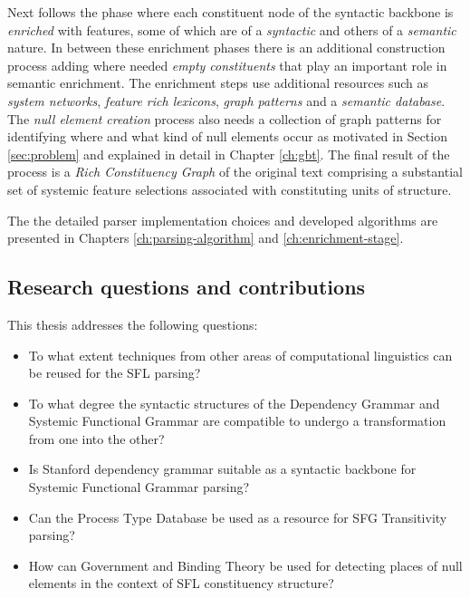 Next follows the phase where each constituent node of the syntactic backbone is \textit{enriched} with features, some of which are of a \textit{syntactic} and others of a \textit{semantic} nature. In between these enrichment phases there is an additional construction process adding where needed \textit{empty constituents} that play an important role in semantic enrichment. The enrichment steps use additional resources such as \textit{system networks}, \textit{feature rich lexicons}, \textit{graph patterns} and a \textit{semantic database}. The \textit{null element creation} process also needs a collection of graph patterns for identifying where and what kind of null elements occur as motivated in Section \ref{sec:problem} and explained in detail in Chapter \ref{ch:gbt}. The final result of the process is a \textit{Rich Constituency Graph} of the original text comprising a substantial set of systemic feature selections associated with constituting units of structure. 

The the detailed parser implementation choices and developed algorithms are presented in Chapters \ref{ch:parsing-algorithm} and \ref{ch:enrichment-stage}.

\subsection{Research questions and contributions} %
This thesis addresses the following questions:
\begin{itemize}
    \item To what extent techniques from other areas of computational linguistics can be reused for the SFL parsing? 
    \item To what degree the syntactic structures of the Dependency Grammar and Systemic Functional Grammar are compatible to undergo a transformation from one into the other?
    \item Is Stanford dependency grammar suitable as a syntactic backbone for Systemic Functional Grammar parsing?
    
    \item Can the Process Type Database be used as a resource for SFG Transitivity parsing?
    \item How can Government and Binding Theory be used for detecting places of null elements in the context of SFL constituency structure?
    
\end{itemize}

